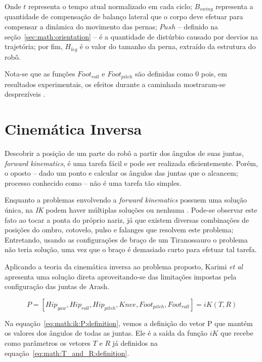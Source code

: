 Onde $t$ representa o tempo atual normalizado em cada ciclo; $B_{swing}$ representa a quantidade de compensação de balanço lateral que o corpo deve efetuar para compensar a dinâmica do movimento das pernas; $Push$ -- definido na seção~\ref{sec:math:orientation} -- é a quantidade de distúrbio causado por desvios na trajetória; por fim, $H_{leg}$ é o valor do tamanho da perna, extraído da estrutura do robô.

Nota-se que as funções $Foot_{roll}$ e $Foot_{pitch}$ são definidas como $0$ pois, em resultados experimentais, os efeitos durante a caminhada mostraram-se desprezíveis \cite{karimionline}.

\section{Cinemática Inversa}

Descobrir a posição de um parte do robô a partir dos ângulos de suas juntas, \textit{forward kinematics}, é uma tarefa fácil e pode ser realizada eficientemente. Porém, o oposto -- dado um ponto e calcular os ângulos das juntas que o alcancem; processo conhecido como -- não é uma tarefa tão simples.

Enquanto a problemas envolvendo a \textit{forward kinematics} possuem uma solução única, na \textit{IK} podem haver múltiplas soluções ou nenhuma \cite{spong2005robot}. Pode-se observar este fato ao tocar a ponta do próprio nariz, já que existem diversas combinações de posições do ombro, cotovelo, pulso e falanges que resolvem este problema; Entretando, usando as configurações de braço de um Tiranossauro o problema não teria solução, uma vez que o braço é demasiado curto para efetuar tal tarefa.

Aplicando a teoria da cinemática inversa ao problema proposto, Karimi \textit{et al} apresenta uma solução direta aproveitando-se das limitações impostas pela configuração das juntas de Arash.

\begin{equation}
	\label{eq:math:ik:P:definition}
	P = [Hip_{yaw}, Hip_{roll}, Hip_{pitch}, Knee, Foot_{pitch}, Foot_{roll}] = iK(T, R)
\end{equation}

Na equação~\ref{eq:math:ik:P:definition}, vemos a definição do vetor P que mantém os valores dos ângulos de todas as juntas. Ele é a saída da função $iK$ que recebe como parâmetros os vetores $T$ e $R$ já definidos na equação~\ref{eq:math:T_and_R:definition}.

